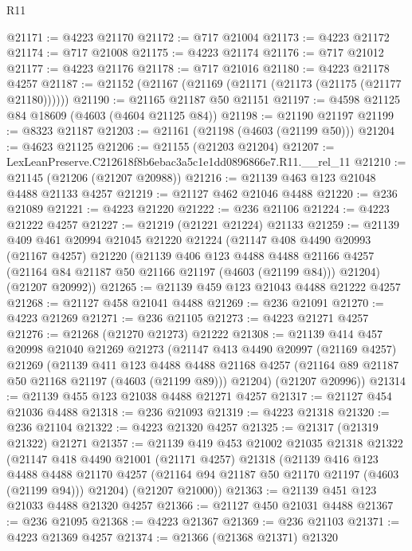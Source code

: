 \begin{lexlean}{R11}
\begin{coremodule}
@21171 := @4223 @21170
@21172 := @717 @21004
@21173 := @4223 @21172
@21174 := @717 @21008
@21175 := @4223 @21174
@21176 := @717 @21012
@21177 := @4223 @21176
@21178 := @717 @21016
@21180 := @4223 @21178 @4257
@21187 := @21152 (@21167 (@21169 (@21171 (@21173 (@21175 (@21177 @21180))))))
@21190 := @21165 @21187 @50 @21151
@21197 := @4598 @21125 @84 @18609 (@4603 (@4604 @21125 @84))
@21198 := @21190 @21197
@21199 := @8323 @21187
@21203 := @21161 (@21198 (@4603 (@21199 @50)))
@21204 := @4623 @21125
@21206 := @21155 (@21203 @21204)
@21207 := LexLeanPreserve.C212618f8b6ebac3a5c1e1dd0896866e7.R11.__rel_11
@21210 := @21145 (@21206 (@21207 @20988))
@21216 := @21139 @463 @123 @21048 @4488 @21133 @4257
@21219 := @21127 @462 @21046 @4488
@21220 := @236 @21089
@21221 := @4223 @21220
@21222 := @236 @21106
@21224 := @4223 @21222 @4257
@21227 := @21219 (@21221 @21224) @21133
@21259 := @21139
    @409
    @461
    @20994
    @21045
    @21220
    @21224
    (@21147
      @408
      @4490
      @20993
      (@21167 @4257)
      @21220
      (@21139
        @406
        @123
        @4488
        @4488
        @21166
        @4257
        (@21164 @84 @21187 @50 @21166 @21197 (@4603 (@21199 @84)))
        @21204)
      (@21207 @20992))
@21265 := @21139 @459 @123 @21043 @4488 @21222 @4257
@21268 := @21127 @458 @21041 @4488
@21269 := @236 @21091
@21270 := @4223 @21269
@21271 := @236 @21105
@21273 := @4223 @21271 @4257
@21276 := @21268 (@21270 @21273) @21222
@21308 := @21139
    @414
    @457
    @20998
    @21040
    @21269
    @21273
    (@21147
      @413
      @4490
      @20997
      (@21169 @4257)
      @21269
      (@21139
        @411
        @123
        @4488
        @4488
        @21168
        @4257
        (@21164 @89 @21187 @50 @21168 @21197 (@4603 (@21199 @89)))
        @21204)
      (@21207 @20996))
@21314 := @21139 @455 @123 @21038 @4488 @21271 @4257
@21317 := @21127 @454 @21036 @4488
@21318 := @236 @21093
@21319 := @4223 @21318
@21320 := @236 @21104
@21322 := @4223 @21320 @4257
@21325 := @21317 (@21319 @21322) @21271
@21357 := @21139
    @419
    @453
    @21002
    @21035
    @21318
    @21322
    (@21147
      @418
      @4490
      @21001
      (@21171 @4257)
      @21318
      (@21139
        @416
        @123
        @4488
        @4488
        @21170
        @4257
        (@21164 @94 @21187 @50 @21170 @21197 (@4603 (@21199 @94)))
        @21204)
      (@21207 @21000))
@21363 := @21139 @451 @123 @21033 @4488 @21320 @4257
@21366 := @21127 @450 @21031 @4488
@21367 := @236 @21095
@21368 := @4223 @21367
@21369 := @236 @21103
@21371 := @4223 @21369 @4257
@21374 := @21366 (@21368 @21371) @21320

\end{coremodule}
\end{lexlean}

